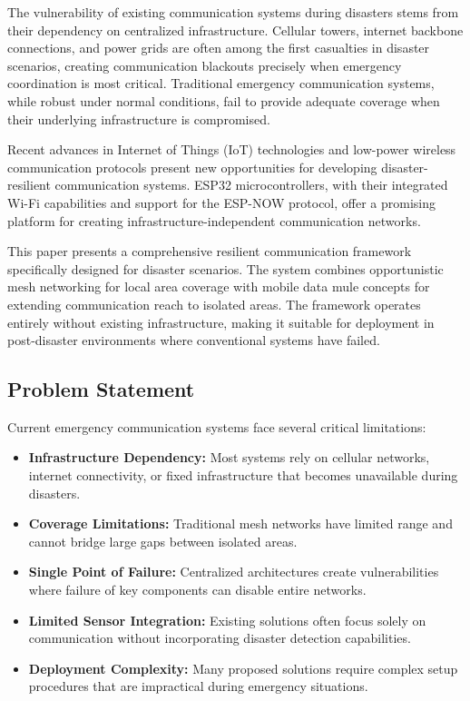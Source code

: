 \documentclass[conference]{IEEEtran}
\begin{document}
The vulnerability of existing communication systems during disasters stems from their dependency on centralized infrastructure. Cellular towers, internet backbone connections, and power grids are often among the first casualties in disaster scenarios, creating communication blackouts precisely when emergency coordination is most critical. Traditional emergency communication systems, while robust under normal conditions, fail to provide adequate coverage when their underlying infrastructure is compromised.

Recent advances in Internet of Things (IoT) technologies and low-power wireless communication protocols present new opportunities for developing disaster-resilient communication systems. ESP32 microcontrollers, with their integrated Wi-Fi capabilities and support for the ESP-NOW protocol, offer a promising platform for creating infrastructure-independent communication networks.

This paper presents a comprehensive resilient communication framework specifically designed for disaster scenarios. The system combines opportunistic mesh networking for local area coverage with mobile data mule concepts for extending communication reach to isolated areas. The framework operates entirely without existing infrastructure, making it suitable for deployment in post-disaster environments where conventional systems have failed.

\subsection{Problem Statement}

Current emergency communication systems face several critical limitations:

\begin{itemize}
\item \textbf{Infrastructure Dependency:} Most systems rely on cellular networks, internet connectivity, or fixed infrastructure that becomes unavailable during disasters.
\item \textbf{Coverage Limitations:} Traditional mesh networks have limited range and cannot bridge large gaps between isolated areas.
\item \textbf{Single Point of Failure:} Centralized architectures create vulnerabilities where failure of key components can disable entire networks.
\item \textbf{Limited Sensor Integration:} Existing solutions often focus solely on communication without incorporating disaster detection capabilities.
\item \textbf{Deployment Complexity:} Many proposed solutions require complex setup procedures that are impractical during emergency situations.
\end{itemize}
\end{document}
